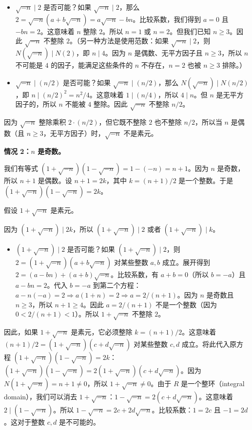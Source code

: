 \begin{itemize}
	\item $\sqrt{-n} \mid 2$ 是否可能？如果 $\sqrt{-n} \mid 2$，那么 $2=\sqrt{-n}(a+b\sqrt{-n})=a\sqrt{-n}-bn$。比较系数，我们得到 $a=0$ 且 $-bn=2$。这意味着 $n$ 整除 $2$。所以 $n=1$ 或 $n=2$。但我们已知 $n \geq 3$。因此 $\sqrt{-n}$ 不整除 $2$。（另一种方法是使用范数：如果 $\sqrt{-n} \mid 2$，则 $N(\sqrt{-n}) \mid N(2)$，即 $n \mid 4$。因为 $n$ 是偶数、无平方因子且 $n \geq 3$，所以 $n$ 不可能是 $4$ 的因子，能满足这些条件的 $n$ 不存在，$n=2$ 也被 $n \geq 3$ 排除。）
	\item $\sqrt{-n} \mid (n/2)$ 是否可能？如果 $\sqrt{-n} \mid (n/2)$，那么 $N(\sqrt{-n}) \mid N(n/2)$，即 $n \mid (n/2)^2=n^2/4$。这意味着 $1 \mid (n/4)$，所以 $4 \mid n$。但 $n$ 是无平方因子的，所以 $n$ 不能被 $4$ 整除。因此 $\sqrt{-n}$ 不整除 $n/2$。
\end{itemize}

因为 $\sqrt{-n}$ 整除乘积 $2 \cdot (n/2)$，但它既不整除 $2$ 也不整除 $n/2$，所以当 $n$ 是偶数（且 $n \geq 3$，无平方因子）时，$\sqrt{-n}$ 不是素元。

\textbf{情况 2：$n$ 是奇数。}

我们有等式 $(1+\sqrt{-n})(1-\sqrt{-n})=1-(-n)=n+1$。因为 $n$ 是奇数，所以 $n+1$ 是偶数。设 $n+1=2k$，其中 $k=(n+1)/2$ 是一个整数。于是 $(1+\sqrt{-n})(1-\sqrt{-n})=2k$。

假设 $1+\sqrt{-n}$ 是素元。

因为 $(1+\sqrt{-n}) \mid 2k$，所以 $(1+\sqrt{-n}) \mid 2$ 或者 $(1+\sqrt{-n}) \mid k$。

\begin{itemize}
	\item $(1+\sqrt{-n}) \mid 2$ 是否可能？如果 $(1+\sqrt{-n}) \mid 2$，则 $2=(1+\sqrt{-n})(a+b\sqrt{-n})$ 对某些整数 $a,b$ 成立。展开得到 $2=(a-bn)+(a+b)\sqrt{-n}$。比较系数，有 $a+b=0$（所以 $b=-a$）且 $a-bn=2$。代入 $b=-a$ 到第二个方程：$a-n(-a)=2 \Longrightarrow a(1+n)=2 \Longrightarrow a=2/(n+1)$。因为 $n$ 是奇数且 $n \geq 3$，所以 $n+1 \geq 4$。因此 $a=2/(n+1)$ 不是一个整数（因为 $0<2/(n+1)<1$）。所以 $1+\sqrt{-n}$ 不整除 $2$。
\end{itemize}

因此，如果 $1+\sqrt{-n}$ 是素元，它必须整除 $k=(n+1)/2$。这意味着 $(n+1)/2=(1+\sqrt{-n})(c+d\sqrt{-n})$ 对某些整数 $c,d$ 成立。将此代入原方程 $(1+\sqrt{-n})(1-\sqrt{-n})=2k$：$(1+\sqrt{-n})(1-\sqrt{-n})=2(1+\sqrt{-n})(c+d\sqrt{-n})$。因为 $N(1+\sqrt{-n})=n+1 \neq 0$，所以 $1+\sqrt{-n} \neq 0$。由于 $R$ 是一个整环（integral domain），我们可以消去 $1+\sqrt{-n}$：$1-\sqrt{-n}=2(c+d\sqrt{-n})$。这意味着 $2 \mid (1-\sqrt{-n})$。所以 $1-\sqrt{-n}=2c+2d\sqrt{-n}$。比较系数：$1=2c$ 且 $-1=2d$。这对于整数 $c,d$ 是不可能的。

